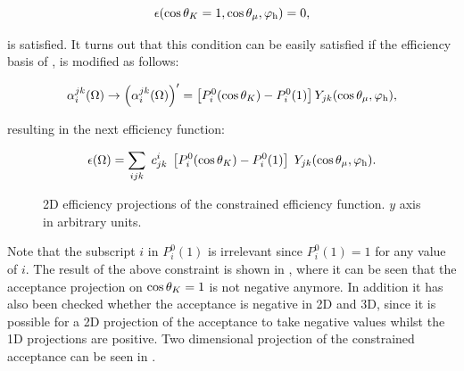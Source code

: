 \begin{equation}
  \centering
  \epsilon(\cos\thetaK = 1, \cos\thetamu, \phihel) = 0,
  \label{eff_func_constr}
\end{equation}

\noindent is satisfied. It turns out that this condition can be easily satisfied if the efficiency basis
of , is modified as follows:

\begin{align}
  \centering
   \effbase \to \parenthesis{\effbase}^\prime = \left[\legendre{i}{0}-P_i^0(1)\right] \spharm{j}{k},
  \label{eff_basis_transform}
  \end{align}

\noindent resulting in the next efficiency function:

\begin{align}
    \centering
  \epsilon(\Omega) = \sum_{ijk} \; \moment{i}{j}{k} \; \left[\legendre{i}{0}-P_i^0(1)\right] \; \spharm{j}{k}.
  \label{eff_func_new}
\end{align}

\begin{figure}[t]
  \centering
  \begin{subfigure}{0.5\textwidth}
    \raggedright
    \scalebox{0.55}{}
    \caption{}
    \label{eff2D_kl}
  \end{subfigure}%
  \hfill%
  \begin{subfigure}{0.5\textwidth}
    \raggedleft
    \scalebox{0.55}{}
    \caption{}
    \label{eff2D_kp}
  \end{subfigure}
  \begin{subfigure}{0.5\textwidth}
    \centering
    \scalebox{0.55}{}
    \caption{}
    \label{eff2D_lp}
  \end{subfigure}
\caption{2D efficiency projections of the constrained efficiency function.
        $y$ axis in arbitrary units.}
    \label{eff2D}
\end{figure}

\noindent Note that the subscript $i$ in $P_i^0(1)$ is irrelevant since $P_i^0(1)=1$ for any value of $i$.
The result of the above constraint is shown in , where it can be seen that
the acceptance projection on $\cos\theta_{K}=1$ is not negative anymore. In addition it has also been checked
whether the acceptance is negative in 2D and 3D, since it is possible for a 2D projection of the acceptance
to take negative values whilst the 1D projections are positive. Two dimensional projection of the constrained
acceptance can be seen in .

